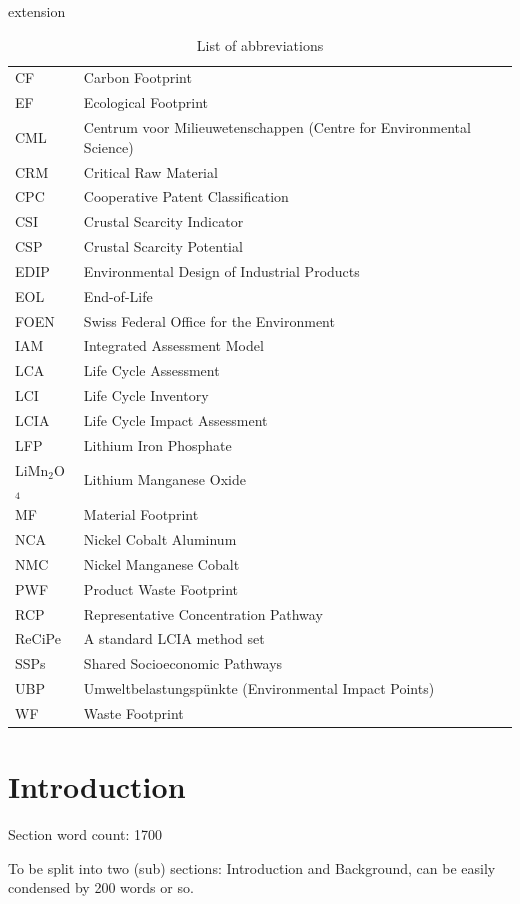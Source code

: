 \documentclass[review,3p,authoryear]{elsarticle}
\newcommand{\cbox}[1]{
    \begin{tcolorbox}[hbox, colback=red!5!white, colframe=red!65!black, boxrule=0.25pt, boxsep=2pt, left=2pt, right=2pt, top=1pt, bottom=1pt]
        \small\sffamily #1
    \end{tcolorbox}
}
\begin{document}
\begin{table}[H]extension
    \centering
    \caption{List of abbreviations}
    \label{tab:abbreviations}
    \begin{tabular}{ll}
    \toprule
    CF & Carbon Footprint \\
    EF & Ecological Footprint \\
    CML & Centrum voor Milieuwetenschappen (Centre for Environmental Science) \\
    CRM & Critical Raw Material \\
    CPC & Cooperative Patent Classification \\
    CSI & Crustal Scarcity Indicator \\
    CSP & Crustal Scarcity Potential \\
    EDIP & Environmental Design of Industrial Products \\
    EOL & End-of-Life \\
    FOEN & Swiss Federal Office for the Environment \\
    IAM & Integrated Assessment Model \\
    LCA & Life Cycle Assessment \\
    LCI & Life Cycle Inventory \\
    LCIA & Life Cycle Impact Assessment \\
    LFP & Lithium Iron Phosphate \\
    LiMn$_2$O$_4$ & Lithium Manganese Oxide \\
    MF & Material Footprint \\
    NCA & Nickel Cobalt Aluminum \\
    NMC & Nickel Manganese Cobalt \\
    PWF & Product Waste Footprint \\
    RCP & Representative Concentration Pathway \\
    ReCiPe & A standard LCIA method set \\
    SSPs & Shared Socioeconomic Pathways \\
    UBP & Umweltbelastungspünkte (Environmental Impact Points) \\
    WF & Waste Footprint \\
    \bottomrule
    \end{tabular}
    \end{table}

\section{Introduction}
\label{sec:introduction}
\cbox{Section word count: 1700}
\cbox{To be split into two (sub) sections: Introduction and Background, can be easily condensed by 200 words or so.}

\end{document}
